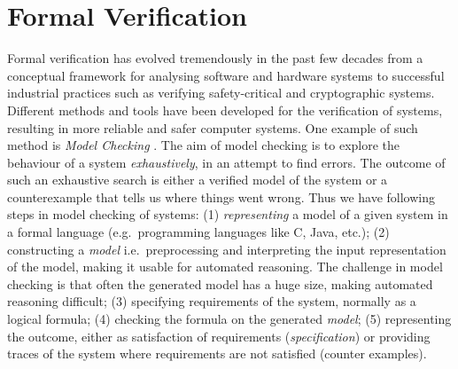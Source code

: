 \documentclass[]{llncs}
\begin{document}
\section{Formal Verification}
Formal verification has evolved tremendously in the past few decades from a conceptual framework for analysing software and hardware systems 
to successful industrial practices such as verifying safety-critical and cryptographic systems. Different methods and tools have been developed for the verification of systems,
resulting in more reliable and safer computer systems. One example of such method is \emph{Model Checking} \cite{pmc}.
The aim of model checking is to explore the behaviour of a system \emph{exhaustively}, in an attempt to find errors.
The outcome of such an exhaustive search is either a verified model of the system or a counterexample that tells us where things
went wrong. Thus we have following steps in model checking of systems: (1) \emph{representing} a model of a given system in a formal language
(e.g.\, programming languages like C, Java, etc.); (2) constructing a \emph{model} i.e.\, 
preprocessing and interpreting the input representation of the model, making it usable for automated reasoning.
The challenge in model checking is that often the generated model has a huge size, making automated reasoning difficult; 
 (3) specifying requirements of the system, normally as a logical formula; (4) checking the formula
on the generated \emph{model}; (5) representing the outcome, either as satisfaction of requirements (\emph{specification}) or providing traces of the system where requirements are not satisfied (counter examples).      
\end{document}
